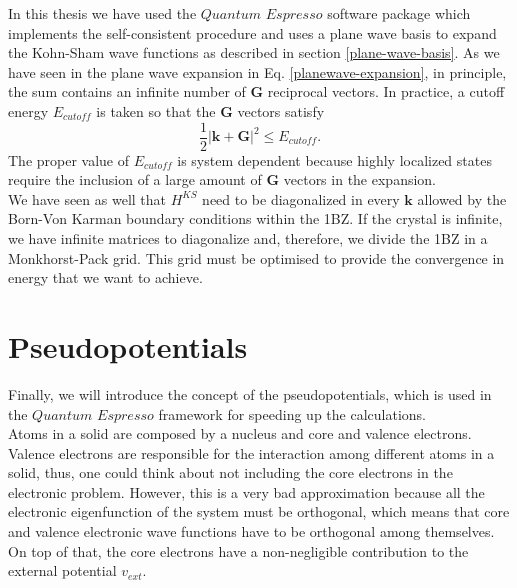 In this thesis we have used the $Quantum$ $Espresso$\cite{giannozzi2009quantum} software package which implements the self-consistent procedure and uses a plane wave basis to expand the Kohn-Sham wave functions as 
described in section \ref{plane-wave-basis}. As we have seen in the plane wave expansion in Eq. \ref{planewave-expansion}, in principle, the sum contains an infinite number of $\mathbf{G}$ reciprocal vectors. In practice, a cutoff 
energy $E_{cutoff}$ is taken so that the $\mathbf{G}$ vectors satisfy 
\begin{equation}
 \frac{1}{2}|\mathbf{k}+\mathbf{G}|^{2}\leq E_{cutoff}.
\end{equation}
The proper value of $E_{cutoff}$ is system dependent because highly localized states require the inclusion of a large amount of $\mathbf{G}$ vectors in the expansion. \\

We have seen as well that $H^{KS}$ need to be diagonalized in every $\mathbf{k}$ allowed by the Born-Von Karman boundary conditions within the 1BZ. If the crystal is infinite, we have infinite matrices to diagonalize 
and, therefore, we divide the 1BZ in a Monkhorst-Pack\cite{monkhorst1976special} grid. This grid must be optimised to provide the convergence in energy that we want to achieve.

\section{Pseudopotentials}

Finally, we will introduce the concept of the pseudopotentials\cite{martin2004electronic}, which is used in the $Quantum$ $Espresso$ framework for speeding up the calculations. \\

Atoms in a solid are composed by a nucleus and core and valence electrons. Valence electrons are responsible for the interaction among different atoms in a solid, thus, one could think about not including the core electrons 
in the electronic problem. However, this is a very bad approximation because all the electronic eigenfunction of the system must be orthogonal, which means that core and valence electronic wave functions have to be orthogonal 
among themselves. On top of that, the core electrons have a non-negligible contribution to the external potential $v_{ext}$. \\



